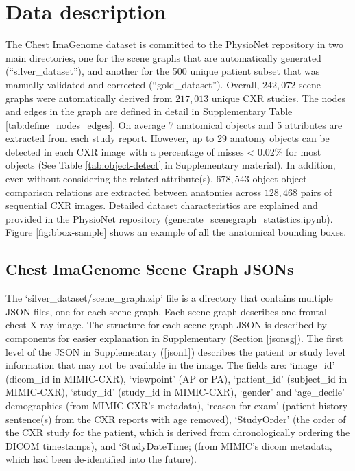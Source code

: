 \section*{Data description}

The Chest ImaGenome dataset is committed to the PhysioNet repository in two main directories, one for the scene graphs that are automatically generated (``silver\_dataset''), and another for the 500 unique patient subset that was manually validated and corrected (``gold\_dataset''). Overall, $242,072$ scene graphs were automatically derived from $217,013$ unique CXR studies. The nodes and edges in the graph are defined in detail in Supplementary Table \ref{tab:define_nodes_edges}. On average 7 anatomical objects and 5 attributes are extracted from each study report. However, up to 29 anatomy objects can be detected in each CXR image with a percentage of misses < 0.02\% for most objects (See Table \ref{tab:object-detect} in Supplementary material). In addition, even without considering the related attribute(s), $678,543$ object-object comparison relations are extracted between anatomies across $128,468$ pairs of sequential CXR images. Detailed dataset characteristics are explained and provided in the PhysioNet repository (generate\_scenegraph\_statistics.ipynb). Figure \ref{fig:bbox-sample} shows an example of all the anatomical bounding boxes.

\vspace{-5pt}
\subsection*{Chest ImaGenome Scene Graph JSONs}
\vspace{-2pt}
The `silver\_dataset/scene\_graph.zip' file is a directory that contains multiple JSON files, one for each scene graph. Each scene graph describes one frontal chest X-ray image. The structure for each scene graph JSON is described by components for easier explanation in Supplementary (Section \ref{jsonsg}). The first level of the JSON in Supplementary (\ref{json1}) describes the patient or study level information that may not be available in the image. The fields are: `image\_id' (dicom\_id in MIMIC-CXR), `viewpoint' (AP or PA), `patient\_id' (subject\_id in MIMIC-CXR), `study\_id' (study\_id in MIMIC-CXR), `gender' and `age\_decile' demographics (from MIMIC-CXR's metadata), `reason for exam' (patient history sentence(s) from the CXR reports with age removed), `StudyOrder' (the order of the CXR study for the patient, which is derived from chronologically ordering the DICOM timestamps), and `StudyDateTime; (from MIMIC's dicom metadata, which had been de-identified into the future).

